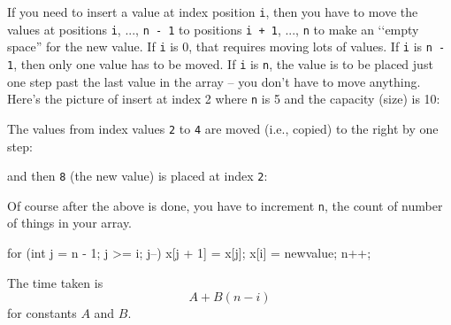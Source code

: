 If you need to insert a value at index position \verb!i!,
then you have to move the values at positions
\verb!i!, ..., \verb!n - 1! to positions
\verb!i + 1!, ..., \verb!n! 
to make an \lq\lq empty space'' for the new value.
If \verb!i! is 0, that requires moving lots of values.
If \verb!i! is \verb!n - 1!, then only one value has to be moved.
If \verb!i! is \verb!n!, the value is to be placed just one step past the
last value in the array -- you don't have to move anything.
Here's the picture of insert at index 2 where \verb!n! is 5
and the capacity (size) is 10:


The values from index values \verb!2! to \verb!4!
are moved (i.e., copied) to the right by one step:


and then \verb!8! (the new value) is placed at index \verb!2!:



Of course after the above is done, you have to increment \verb!n!,
the count of number of things in your array.
\begin{console}
for (int j = n - 1; j >= i; j--)
{ 
    x[j + 1] = x[j];
}
x[i] = newvalue;
n++;
\end{console}
The time taken is
\[
A + B(n - i)
\]
for constants $A$ and $B$.

